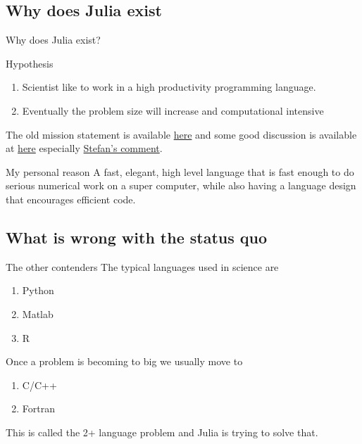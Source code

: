 \documentclass{beamer}
\begin{document}
\subsection{Why does Julia exist}
\begin{frame}{Why does Julia exist?}
  \pause
  \begin{block}{Hypothesis}
    \begin{enumerate}
      \item Scientist like to work in a high productivity programming language. 
      \item Eventually the problem size will increase and computational intensive
    \end{enumerate}
  \end{block}
\pause
  The old mission statement is available \href{https://julialang.org/blog/2012/02/why-we-created-julia}{\color{blue} here} and some good discussion is available at \href{https://discourse.julialang.org/t/julia-motivation-why-werent-numpy-scipy-numba-good-enough/2236/}{\color{blue} here} especially \href{https://discourse.julialang.org/t/julia-motivation-why-werent-numpy-scipy-numba-good-enough/2236/10}{\color{blue} Stefan's comment}. 
\pause
  \begin{block}{My personal reason}
    A fast, elegant, high level language that is fast enough to do serious numerical work on a super computer, while also having a language design that encourages efficient code.
  \end{block}

\end{frame}
\subsection{What is wrong with the status quo}
\begin{frame}{The other contenders}
  The typical languages used in science are
  \begin{enumerate}
    \item Python
    \item Matlab
    \item R
  \end{enumerate}

  Once a problem is becoming to big we usually move to
  \begin{enumerate}
    \item C/C++
    \item Fortran
  \end{enumerate}
  This is called the 2+ language problem and Julia is trying to solve that.
\end{frame}
\end{document}
